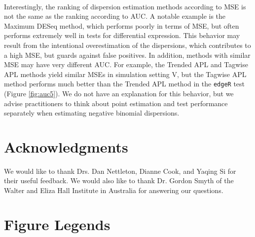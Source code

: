 \documentclass[10pt]{article}
\begin{document}
\paragraph{} \indent Interestingly, the ranking of dispersion estimation methods according to MSE is not the same as the ranking according to AUC. A notable example is the Maximum DESeq method, which performs poorly in terms of MSE, but often performs extremely well in tests for differential expression. This behavior may result from the intentional overestimation of the dispersions, which contributes to a high MSE, but guards against false positives. { In addition, methods with similar MSE may %
 have very different AUC. %
 For example, the Trended APL and Tagwise APL methods yield similar MSEs in simulation setting V, but the Tagwise APL method performs much better than the Trended APL method in the {\tt edgeR} test (Figure \ref{fig:auc5}). We do not have an explanation for this behavior, but we advise practitioners to think about point estimation and test performance separately when estimating negative binomial dispersions.} %

\section*{Acknowledgments}

\paragraph{} \indent We would like to thank Drs. Dan Nettleton, Dianne Cook, and Yaqing Si for their useful feedback. We would also like to thank Dr. Gordon Smyth of the Walter and Eliza Hall Institute in Australia for answering our questions. %



\section*{Figure Legends}
\end{document}
